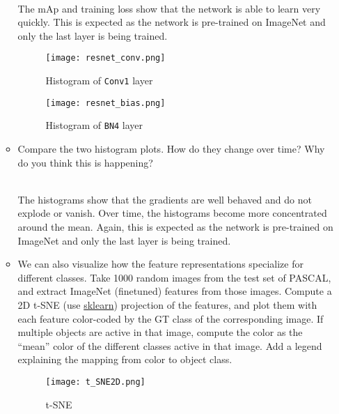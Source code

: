 \documentclass[11pt,addpoints,answers]{exam}
\numberwithin{equation}{section} %
\numberwithin{figure}{section} %
\numberwithin{table}{section} %
\begin{document}
\begin{itemize}
\begin{itemize}
        \begin{solution}
        \\ The mAp and training loss show that the network is able to learn very quickly.
        This is expected as the network is pre-trained on ImageNet and only the last layer is being trained.
        \end{solution}
        
        \begin{figure}[H]
        \centering
        \texttt{[image: resnet\_conv.png]}
        \caption{Histogram of \texttt{Conv1} layer}
        \label{fig:q2_histogram_conv1}
        \end{figure}
        
        \begin{figure}[H]
        \centering
        \texttt{[image: resnet\_bias.png]}
        \caption{Histogram of \texttt{BN4} layer}
        \label{fig:q2_bn}
        \end{figure}

        \item Compare the two histogram plots. How do they change over time? Why do you think this is happening?

        \begin{solution}
        \\ The histograms show that the gradients are well behaved and do not explode or vanish.
        Over time, the histograms become more concentrated around the mean.
        Again, this is expected as the network is pre-trained on ImageNet and only the last layer is being trained.
        \end{solution}
        
        \item We can also visualize how the feature representations specialize for different classes. Take 1000 random images from the test set of PASCAL, and extract ImageNet (finetuned) features from those images. Compute a 2D t-SNE (use \href{https://scikit-learn.org/stable/modules/generated/sklearn.manifold.TSNE.html}{sklearn}) projection of the features, and plot them with each feature color-coded by the GT class of the corresponding image. If multiple objects are active in that image, compute the color as the ``mean” color of the different classes active in that image. Add a legend explaining the mapping from color to object class. 

        \begin{figure}[H]
        \centering
        \texttt{[image: t\_SNE2D.png]}
        \caption{t-SNE}
        \label{fig:q2_tsne}
        \end{figure}


\end{itemize}
\end{itemize}
\end{document}
